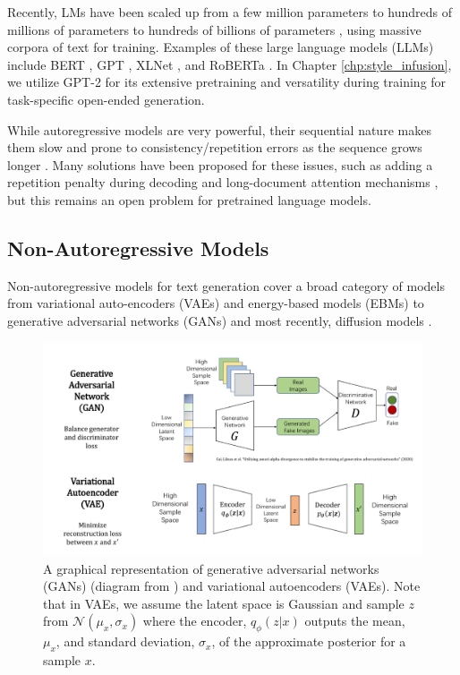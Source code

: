 Recently, LMs have been scaled up from a few million parameters to hundreds of millions of parameters to hundreds of billions of parameters \citep{brown2020language}, using massive corpora of text for training. Examples of these large language models (LLMs) include BERT \citep{devlin-etal-2019-bert}, GPT \citep{radford2018improving, radford2019language, brown2020language}, XLNet \citep{yang2019xlnet}, and RoBERTa \citep{liu2019roberta}. In Chapter \ref{chp:style_infusion}, we utilize GPT-2 for its extensive pretraining and versatility during training for task-specific open-ended generation.

While autoregressive models are very powerful, their sequential nature makes them slow and prone to consistency/repetition errors as the sequence grows longer \citep{bender2021dangers}. Many solutions have been proposed for these issues, such as adding a repetition penalty during decoding \citep{he2021parallel} and long-document attention mechanisms \citep{beltagy2020longformer}, but this remains an open problem for pretrained language models.

\subsection{Non-Autoregressive Models}
\label{rel:non_autoreg_models}

Non-autoregressive models for text generation cover a broad category of models from variational auto-encoders (VAEs) \citep{kingma2013auto} and energy-based models (EBMs) \citep{deng2020residual} to generative adversarial networks (GANs) \citep{goodfellow2020generative} and most recently, diffusion models \citep{ho2020denoising}. 

\begin{figure}[ht]
  \centering
  \caption{A graphical representation of generative adversarial networks (GANs) (diagram from \citet{cai2020utilizing}) and variational autoencoders (VAEs). Note that in VAEs, we assume the latent space is Gaussian and sample $z$ from $\mathcal{N}(\mu_x, \sigma_x)$ where the encoder, $q_{\phi}(z | x)$ outputs the mean, $\mu_x$, and standard deviation, $\sigma_x$, of the approximate posterior for a sample $x$.}
  \label{fig:vae_gan}
  \includegraphics[width=\linewidth]{figs/gan_vae.pdf}
\end{figure}

